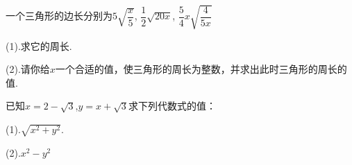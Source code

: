 \vspace{2cm}
\begin{example}
    一个三角形的边长分别为$5\sqrt{\dfrac{x}{5}}$, $\dfrac{1}{2} \sqrt{20 x}$, $\dfrac{5}{4} x \sqrt{\dfrac{4}{5 x}}$\par
    (1).求它的周长.\par
     (2).请你给$x$一个合适的值，使三角形的周长为整数，并求出此时三角形的周长的值.
\end{example}
\vspace{2cm}
\begin{example}已知$x=2-\sqrt{3}$,$y=x+\sqrt{3}$求下列代数式的值：\par
        (1).$\sqrt{x^2+y^2}$.\par
    (2).$x^2-y^2$
\end{example}


